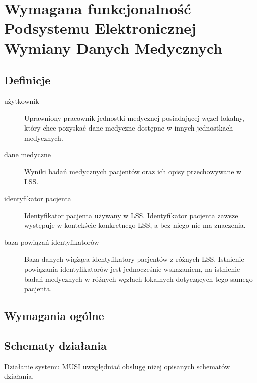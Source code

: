 \documentclass[a4paper]{report}
\begin{document}
\chapter[Podsystem Elektronicznej Wymiany Danych Medycznych]{Wymagana funkcjonalność Podsystemu Elektronicznej Wymiany Danych Medycznych}

\section{Definicje}
\begin{description}
\item[użytkownik] Uprawniony pracownik jednostki medycznej posiadającej węzeł lokalny, który chce pozyskać dane
      medyczne dostępne w innych jednostkach medycznych.
\item[dane medyczne] Wyniki badań medycznych pacjentów oraz ich opisy przechowywane w LSS.
\item[identyfikator pacjenta] Identyfikator pacjenta używany w LSS. Identyfikator pacjenta zawsze występuje w kontekście
      konkretnego LSS, a bez niego nie ma znaczenia.
\item[baza powiązań identyfikatorów] Baza danych wiążąca identyfikatory pacjentów z różnych LSS. Istnienie powiązania
      identyfikatorów jest jednocześnie wskazaniem, na istnienie badań medycznych w różnych węzłach lokalnych dotyczących
      tego samego pacjenta.
\end{description}

\section{Wymagania ogólne}



\section{Schematy działania}

Działanie systemu MUSI uwzględniać obsługę niżej opisanych schematów działania.
\end{document}

